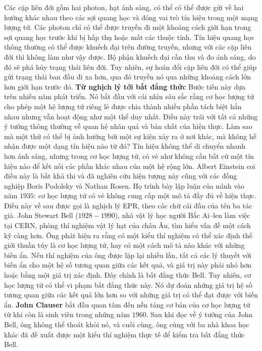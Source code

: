 \begin{multicols}{2}
\begin{figure}[H]
		\vspace*{-10pt}
	\end{figure}
	Các cặp liên đới gồm hai photon, hạt ánh sáng, có thể có thể được gửi về hai hướng khác nhau theo các sợi quang học và đóng vai trò tín hiệu trong một mạng lượng tử. Các photon chỉ có thể được truyền đi một khoảng cách giới hạn trong sợi quang học trước khi bị hấp thụ hoặc mất các thuộc tính. Tín hiệu quang học thông thường có thể được khuếch đại trên đường truyền, nhưng với các cặp liên đới thì không làm như vậy được. Bộ phận khuếch đại cần thu và đo ánh sáng, do đó sẽ phá hủy trạng thái liên đới. Tuy nhiên, sự hoán đổi cặp liên đới có thể giúp gửi trạng thái ban đầu đi xa hơn, qua đó truyền nó qua những khoảng cách lớn hơn giới hạn trước đó.
	\vskip 0.1cm
	\textbf{\color{timhieukhoahoc}Từ nghịch lý tới bất đẳng thức}
	\vskip 0.1cm
	Bước tiến này dựa trên nhiều năm phát triển. Nó bắt đầu với cái nhìn sâu sắc rằng cơ học lượng tử cho phép một hệ lượng tử riêng lẻ được chia thành nhiều phần tách biệt hẳn nhau nhưng vẫn hoạt động như một thể duy nhất.
	\vskip 0.1cm
	Điều này trái với tất cả những ý tưởng thông thường về quan hệ nhân quả và bản chất của hiện thực. Làm sao mà một thứ có thể bị ảnh hưởng bởi một sự kiện xảy ra ở nơi khác, mà không hề nhận được một dạng tín hiệu nào từ đó? Tín hiệu không thể di chuyển nhanh hơn ánh sáng, nhưng trong cơ học lượng tử, có vẻ như không cần bất cứ một tín hiệu nào để kết nối các phần khác nhau của một hệ rộng lớn.
	\vskip 0.1cm
	Albert Einstein coi điều này là bất khả thi và đã nghiên cứu hiện tượng này cũng với các đồng nghiệp Boris Podolsky và Nathan Rosen. Họ trình bày lập luận của mình vào năm $1935$: cơ học lượng tử có vẻ không cung cấp một mô tả đầy đủ về hiện thực. Điều này về sau được gọi là nghịch lý EPR, theo các chữ cái đầu của tên ba tác giả.
	\vskip 0.1cm
	John Stewart Bell ($1928 - 1990$), nhà vật lý học người Bắc Ai--len làm việc tại CERN, phòng thí nghiệm vật lý hạt của châu Âu, tìm hiểu vấn đề một cách kỹ càng hơn. Ông phát hiện ra rằng có một kiểu thí nghiệm có thể xác định thế giới thuần túy là cơ học lượng tử, hay có một cách mô tả nào khác với những biến ẩn. Nếu thí nghiệm của ông được lặp lại nhiều lần, tất cả các lý thuyết với biến ẩn cho một hệ số tương quan giữa các kết quả, và giá trị này phải nhỏ hơn hoặc bằng một giá trị xác định. Đây chính là bất đẳng thức Bell.
	\vskip 0.1cm
	Tuy nhiên, cơ học lượng tử có thể vi phạm bất đẳng thức này. Nó dự đoán những giá trị hệ số tương quan giữa các kết quả lớn hơn so với những giá trị có thể đạt được với biến ẩn.
	\vskip 0.1cm
	\textbf{\color{timhieukhoahoc}John Clauser} bắt đầu quan tâm đến nền tảng cơ bản của cơ học lượng tử từ khi còn là sinh viên trong những năm $1960$. Sau khi đọc về ý tưởng của John Bell, ông không thể thoát khỏi nó, và cuối cùng, ông cùng với ba nhà khoa học khác đã đề xuất được một kiểu thí nghiệm thực tế để kiểm tra bất đẳng thức Bell.

\end{multicols}
